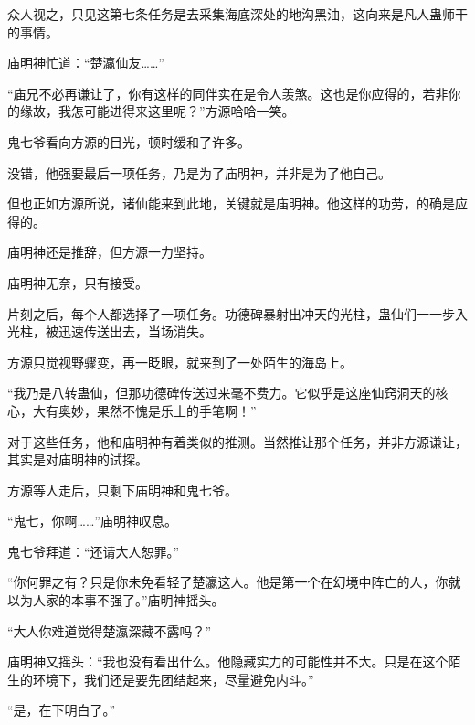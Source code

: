 \begin{this_body}
众人视之，只见这第七条任务是去采集海底深处的地沟黑油，这向来是凡人蛊师干的事情。

庙明神忙道：“楚瀛仙友……”

“庙兄不必再谦让了，你有这样的同伴实在是令人羡煞。这也是你应得的，若非你的缘故，我怎可能进得来这里呢？”方源哈哈一笑。

鬼七爷看向方源的目光，顿时缓和了许多。

没错，他强要最后一项任务，乃是为了庙明神，并非是为了他自己。

但也正如方源所说，诸仙能来到此地，关键就是庙明神。他这样的功劳，的确是应得的。

庙明神还是推辞，但方源一力坚持。

庙明神无奈，只有接受。

片刻之后，每个人都选择了一项任务。功德碑暴射出冲天的光柱，蛊仙们一一步入光柱，被迅速传送出去，当场消失。

方源只觉视野骤变，再一眨眼，就来到了一处陌生的海岛上。

“我乃是八转蛊仙，但那功德碑传送过来毫不费力。它似乎是这座仙窍洞天的核心，大有奥妙，果然不愧是乐土的手笔啊！”

对于这些任务，他和庙明神有着类似的推测。当然推让那个任务，并非方源谦让，其实是对庙明神的试探。

方源等人走后，只剩下庙明神和鬼七爷。

“鬼七，你啊……”庙明神叹息。

鬼七爷拜道：“还请大人恕罪。”

“你何罪之有？只是你未免看轻了楚瀛这人。他是第一个在幻境中阵亡的人，你就以为人家的本事不强了。”庙明神摇头。

“大人你难道觉得楚瀛深藏不露吗？”

庙明神又摇头：“我也没有看出什么。他隐藏实力的可能性并不大。只是在这个陌生的环境下，我们还是要先团结起来，尽量避免内斗。”

“是，在下明白了。”

\end{this_body}

